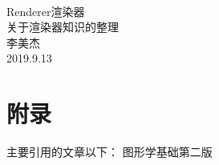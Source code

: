 \documentclass[UTF8]{article}
\begin{document}
\begin{center}
    \quad \\
    \vspace{3cm}
    \hspace{1cm}\Huge{Renderer渲染器} \\
    \small{关于渲染器知识的整理} \\
    \vspace{1cm}
    \hspace{1cm}\Large{李美杰} \\
    \vspace{0.5cm}
    \hspace{1cm}\Large{2019.9.13}
    \clearpage
\end{center}

\thispagestyle{empty}
\clearpage

\tableofcontents
\clearpage

\lstset{
    language=C,
    numbers=left,
    frame=box
}







\clearpage
\section{附录}
主要引用的文章以下：
\cite{RAPI}
\cite{Renderer}
\cite{FoCG2Ed} 图形学基础第二版



\end{document}
